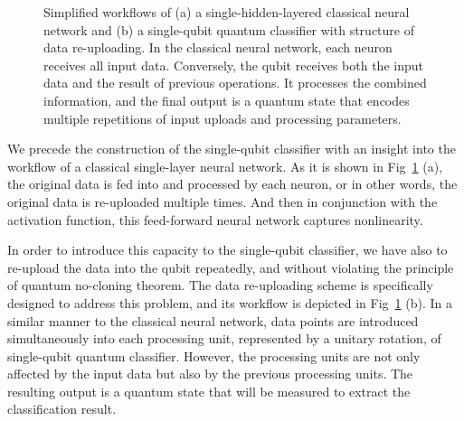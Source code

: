 \begin{figure}[H]
\centering
{}
\caption{Simplified workflows of (a) a single-hidden-layered classical neural network and (b) a single-qubit quantum classifier with structure of data re-uploading.
In the classical neural network, each neuron receives all input data. Conversely, the qubit receives both the input data and the result of previous operations.  It processes the combined information, and the final output is a quantum state that encodes multiple repetitions of input uploads and processing parameters.}
\label{diagram_data_reuploading}
\end{figure}

We precede the construction of the single-qubit classifier with an insight into the workflow of a classical single-layer neural network.
As it is shown in Fig~\ref{diagram_data_reuploading} (a), the  original data is fed into and processed by each neuron, or in other words, the original data is re-uploaded multiple times. And then in conjunction with the activation function, this feed-forward neural network captures nonlinearity.

In order to introduce this capacity to the single-qubit classifier, we have also to re-upload the data into the qubit repeatedly, and without violating the principle of quantum no-cloning theorem. The data re-uploading scheme \cite{PerezSalinas2020datareuploading} is specifically designed to address this problem, and its workflow is depicted in Fig~\ref{diagram_data_reuploading} (b). In a similar manner to the classical neural network, data points are introduced simultaneously into each processing unit, represented by a unitary rotation, of single-qubit quantum classifier. 
However, the processing units are not only affected by the input data but also by the previous processing units.
The resulting output is a quantum state that will be measured to extract the classification result.

